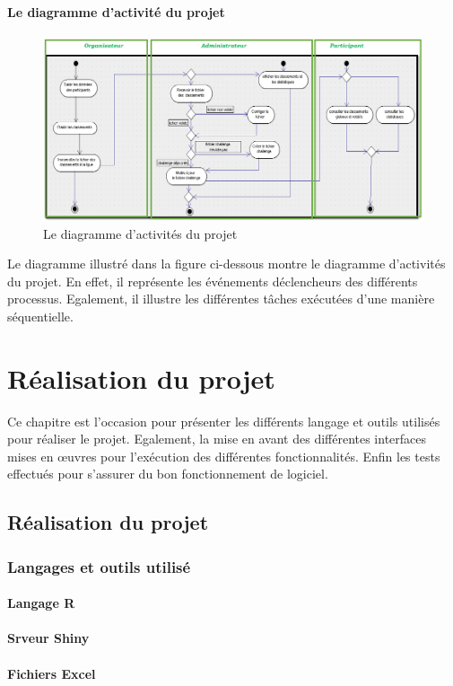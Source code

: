 \documentclass[12pt,a4paper]{report}
\begin{document}
\subsubsection{Le diagramme d'activité du projet}
\begin{figure}
	   \center
	   \includegraphics[scale=0.5]{Diagramme_activites.png}
	   \caption {Le diagramme d’activités du projet}
\end{figure}

Le diagramme illustré dans la figure ci-dessous montre le diagramme d’activités du projet. En effet, il représente les événements déclencheurs des différents processus. Egalement, il illustre les différentes tâches exécutées d’une manière séquentielle. 
\newpage
\chapter{Réalisation du projet}
Ce chapitre est l’occasion pour présenter les différents langage et outils utilisés pour réaliser le projet. Egalement, la mise en avant des différentes interfaces mises en œuvres pour l’exécution des différentes fonctionnalités. Enfin les tests effectués pour s’assurer du bon fonctionnement de logiciel.

\newpage
\section {Réalisation du projet }
\subsection {Langages et outils utilisé  }
\subsubsection {Langage R  }


\subsubsection {Srveur Shiny}

\subsubsection {Fichiers Excel}




	
	
	
\end{document}
